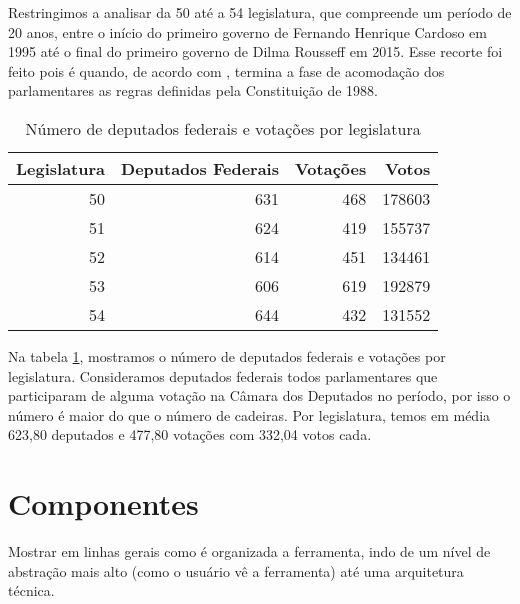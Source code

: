 \documentclass[a4paper,titlepage]{ppgi}\usepackage[]{graphicx}\usepackage[]{color}
\newenvironment{knitrout}{}{} %
\begin{document}
Restringimos a analisar da 50\textordfeminine{} até a 54\textordfeminine{}
legislatura, que compreende um período de 20 anos, entre o início do primeiro
governo de Fernando Henrique Cardoso em 1995 até o final do primeiro governo de
Dilma Rousseff em 2015. Esse recorte foi feito pois é quando, de acordo com
\cite{Freitas2008}, termina a fase de acomodação dos parlamentares as regras
definidas pela Constituição de 1988.

\begin{table}
\centering
\begin{knitrout}
\color{fgcolor}
\begin{tabular}{r|r|r|r}
\hline
Legislatura & Deputados Federais & Votações & Votos\\
\hline
50 & 631 & 468 & 178603\\
\hline
51 & 624 & 419 & 155737\\
\hline
52 & 614 & 451 & 134461\\
\hline
53 & 606 & 619 & 192879\\
\hline
54 & 644 & 432 & 131552\\
\hline
\end{tabular}


\end{knitrout}
\caption{Número de deputados federais e votações por legislatura}
\label{table:estatisticas-legislaturas}
\end{table}

Na tabela \ref{table:estatisticas-legislaturas}, mostramos o número de
deputados federais e votações por legislatura. Consideramos deputados federais
todos parlamentares que participaram de alguma votação na Câmara dos Deputados
no período, por isso o número é maior do que o número de cadeiras. Por
legislatura, temos em média 623,80 deputados e 477,80
votações com 332,04 votos cada.

\section{Componentes}

Mostrar em linhas gerais como é organizada a ferramenta, indo de um nível de abstração mais alto (como o usuário vê a ferramenta) até uma arquitetura técnica.


\end{document}

